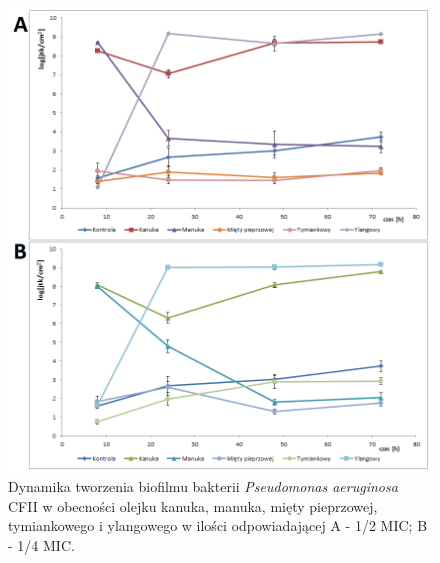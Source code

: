 \documentclass[11pt,a4paper]{report}
\begin{document}
\begin{figure}[!h]
\begin{center}
\includegraphics[scale=0.7]{img/cfii-b.png}
\caption{Dynamika tworzenia biofilmu bakterii \textit{Pseudomonas aeruginosa} CFII w obecności olejku kanuka, manuka, mięty pieprzowej, tymiankowego i ylangowego w ilości odpowiadającej A - 1/2 MIC; B - 1/4 MIC.}\label{cfii-b}
\end{center} 
\end{figure}

\clearpage
\end{document}
